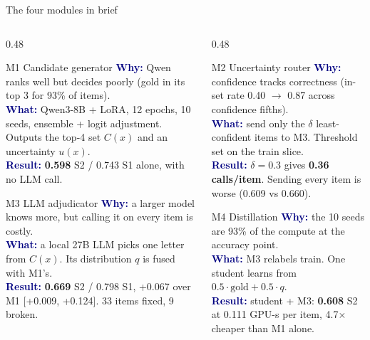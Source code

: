 \documentclass[aspectratio=169,10pt]{beamer}
\newcommand{\hl}[1]{\textcolor{accent}{\textbf{#1}}}
\newcommand{\modcard}[4]{%
  \begin{block}{#1}\footnotesize
    \textcolor{navy}{\textbf{Why:}} #2\\[1pt]
    \textcolor{navy}{\textbf{What:}} #3\\[1pt]
    \textcolor{navy}{\textbf{Result:}} #4
  \end{block}}
\begin{document}
\begin{frame}{The four modules in brief}
  \begin{columns}[T]
    \begin{column}{0.48\textwidth}
      \modcard{M1 \quad Candidate generator}
        {Qwen ranks well but decides poorly (gold in its top 3 for 93\% of items).}
        {Qwen3-8B + LoRA, 12 epochs, 10 seeds, ensemble + logit adjustment. Outputs the top-4 set $C(x)$ and an uncertainty $u(x)$.}
        {\hl{0.598} S2 / 0.743 S1 alone, with no LLM call.}
      \modcard{M3 \quad LLM adjudicator}
        {a larger model knows more, but calling it on every item is costly.}
        {a local 27B LLM picks one letter from $C(x)$. Its distribution $q$ is fused with M1's.}
        {\hl{0.669} S2 / 0.798 S1, +0.067 over M1 [+0.009, +0.124]. 33 items fixed, 9 broken.}
    \end{column}
    \begin{column}{0.48\textwidth}
      \modcard{M2 \quad Uncertainty router}
        {confidence tracks correctness (in-set rate 0.40 $\rightarrow$ 0.87 across confidence fifths).}
        {send only the $\delta$ least-confident items to M3. Threshold set on the train slice.}
        {$\delta=0.3$ gives \hl{0.36 calls/item}. Sending every item is worse (0.609 vs 0.660).}
      \modcard{M4 \quad Distillation}
        {the 10 seeds are 93\% of the compute at the accuracy point.}
        {M3 relabels train. One student learns from $0.5\cdot\text{gold}+0.5\cdot q$.}
        {student + M3: \hl{0.608} S2 at 0.111 GPU-s per item, 4.7$\times$ cheaper than M1 alone.}
    \end{column}
  \end{columns}
\end{frame}
\end{document}
